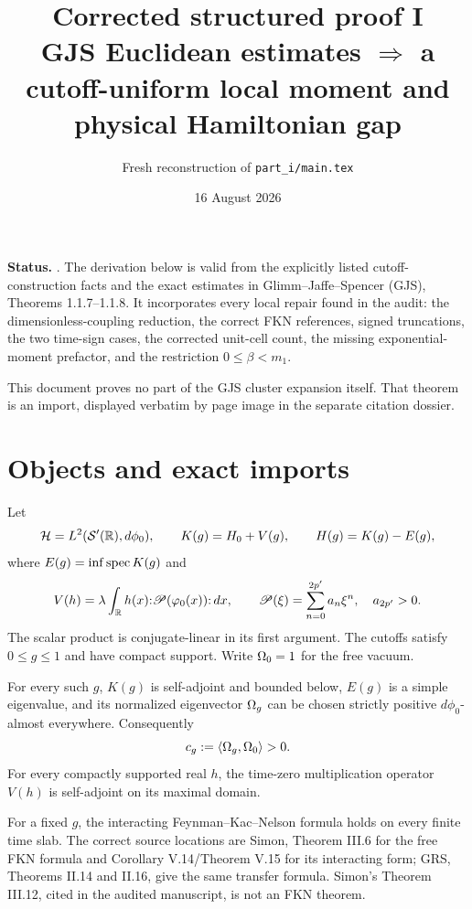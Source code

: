 \documentclass[11pt,a4paper]{article}
\title{Corrected structured proof I\\[3pt]
GJS Euclidean estimates $\Longrightarrow$ a cutoff-uniform local moment and physical Hamiltonian gap}
\author{Fresh reconstruction of \texttt{part\_i/main.tex}}
\date{16 August 2026}
\begin{document}
\maketitle

\begin{resultbox}
\textbf{Status.} \Conditional.  The derivation below is valid from the explicitly listed
cutoff-construction facts and the exact estimates in Glimm--Jaffe--Spencer (GJS),
Theorems 1.1.7--1.1.8.  It incorporates every local repair found in the audit: the
dimensionless-coupling reduction, the correct FKN references, signed truncations, the
two time-sign cases, the corrected unit-cell count, the missing exponential-moment
prefactor, and the restriction $0\leq\beta<m_1$.

This document proves no part of the GJS cluster expansion itself.  That theorem is an
import, displayed verbatim by page image in the separate citation dossier.
\end{resultbox}

\tableofcontents

\section{Objects and exact imports}

Let
\[
 \mathcal H=L^2(\mathcal S'(\mathbb R),d\phi_0),\qquad
 K(g)=H_0+V(g),\qquad H(g)=K(g)-E(g),
\]
where $E(g)=\inf\operatorname{spec} K(g)$ and
\[
 V(h)=\lambda\int_{\mathbb R}h(x){:}\mathscr P(\varphi_0(x)){:}\,dx,
 \qquad \mathscr P(\xi)=\sum_{n=0}^{2p'}a_n\xi^n,\quad a_{2p'}>0.
\]
The scalar product is conjugate-linear in its first argument.  The cutoffs satisfy
$0\leq g\leq1$ and have compact support.  Write $\Omega_0=1$ for the free vacuum.

\begin{assumption}\label{ass:cutoff}
For every such $g$, $K(g)$ is self-adjoint and bounded below, $E(g)$ is a simple
eigenvalue, and its normalized eigenvector $\Omega_g$ can be chosen strictly positive
$d\phi_0$-almost everywhere.  Consequently
\[
 c_g:=\langle \Omega_g,\Omega_0\rangle>0.
\]
For every compactly supported real $h$, the time-zero multiplication operator $V(h)$
is self-adjoint on its maximal domain.
\end{assumption}

\begin{assumption}\label{ass:fkn}
For a fixed $g$, the interacting Feynman--Kac--Nelson formula holds on every finite
time slab.  The correct source locations are Simon, Theorem III.6 for the free FKN
formula and Corollary V.14/Theorem V.15 for its interacting form; GRS, Theorems
II.14 and II.16, give the same transfer formula.  Simon's Theorem III.12, cited in
the audited manuscript, is not an FKN theorem.
\end{assumption}
\end{document}
